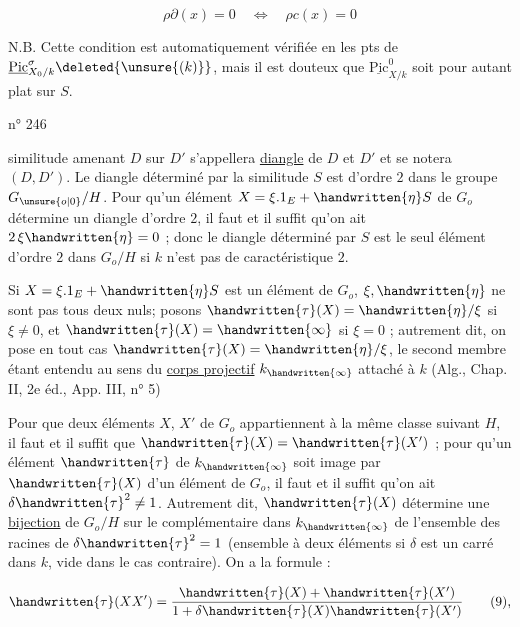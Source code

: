\[
\rho\partial(x)=0\quad\Longleftrightarrow\quad\rho c(x)=0
\]

N.B. Cette condition est automatiquement vérifiée en les pts  de $\underline{\mathrm{Pic}}^{\sigma}_{X_0/k}\deleted{\unsure{(k)}}$, mais il est douteux que $\underline{\mathrm{Pic}}^0_{X/k}$ soit pour autant plat sur $S$.




n° 246

similitude amenant $D$ sur $D'$ s'appellera  \uline{diangle} de $D$ et $D'$ et se notera $(D,D')$. Le diangle déterminé par la similitude $S$ est d'ordre $2$ dans le groupe $G_{\unsure{o|0}}/H$. Pour qu'un élément $X=\xi.1_E+\handwritten{\eta} S$ de $G_o$ détermine un diangle d'ordre $2$, il faut et il suffit qu'on ait $2\,\xi\handwritten{\eta}=0$ ; donc le diangle déterminé par $S$ est le seul élément d'ordre $2$ dans $G_o/H$ si $k$ n'est pas de caractéristique $2$.

Si $X=\xi.1_E+\handwritten{\eta} S$ est un élément de $G_o$, $\xi,\handwritten{\eta}$ ne sont pas tous deux nuls; posons $\handwritten{\tau}(X)=\handwritten{\eta}/\xi$ si $\xi\ne0$, et $\handwritten{\tau}(X)=\handwritten{\infty}$ si $\xi=0$ ; autrement dit, on pose en tout cas $\handwritten{\tau}(X)=\handwritten{\eta}/\xi$, le second membre étant entendu au sens du \uline{corps projectif} $k_{\handwritten{\infty}}$ attaché à $k$ (Alg., Chap. II, 2e éd., App. III, n° 5)

Pour que deux éléments $X$, $X'$ de $G_o$ appartiennent à la même classe suivant $H$, il faut et il suffit que $\handwritten{\tau}(X)=\handwritten{\tau}(X')$ ; pour qu'un élément $\handwritten{\tau}$ de $k_{\handwritten{\infty}}$ soit image par $\handwritten{\tau}(X)$ d'un élément de $G_o$, il faut et il suffit qu'on ait $\delta\handwritten{\tau}^2\ne1$. Autrement dit, $\handwritten{\tau}(X)$ détermine une \uline{bijection} de $G_o/H$ sur le complémentaire dans $k_{\handwritten{\infty}}$ de l'ensemble des racines de $\delta\handwritten{\tau}^2=1$ (ensemble à deux éléments si $\delta$ est un carré dans $k$, vide dans le cas contraire). On a la formule :

\[
\handwritten{\tau}(XX')=\frac{\handwritten{\tau}(X)+\handwritten{\tau}(X')}{1+\delta\handwritten{\tau}(X)\handwritten{\tau}(X')}\tag*{(9),}
\]

